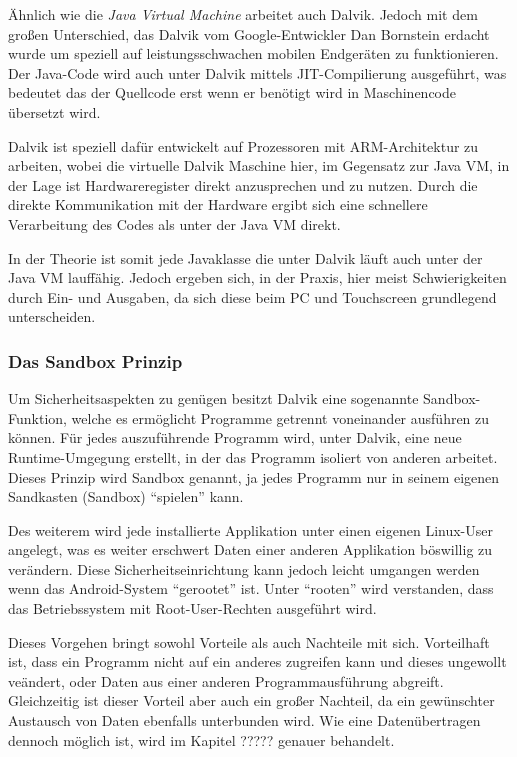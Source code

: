 \"Ahnlich wie die \emph{Java Virtual Machine} arbeitet auch Dalvik. Jedoch mit dem gro\ss{}en Unterschied, das Dalvik vom Google-Entwickler Dan Bornstein erdacht wurde um speziell auf leistungsschwachen mobilen Endger\"aten zu funktionieren. Der Java-Code wird auch unter Dalvik mittels \ac{JIT}-Compilierung ausgef\"uhrt, was bedeutet das der Quellcode erst wenn er ben\"otigt wird in Maschinencode \"ubersetzt wird.

Dalvik ist speziell daf\"ur entwickelt auf Prozessoren mit ARM-Architektur zu arbeiten, wobei die virtuelle Dalvik Maschine hier, im Gegensatz zur Java VM, in der Lage ist Hardwareregister direkt anzusprechen und zu nutzen. Durch die direkte Kommunikation mit der Hardware ergibt sich eine schnellere Verarbeitung des Codes als unter der Java VM direkt.

In der Theorie ist somit jede Javaklasse die unter Dalvik l\"auft auch unter der Java VM lauff\"ahig. Jedoch ergeben sich, in der Praxis, hier meist Schwierigkeiten durch Ein- und Ausgaben, da sich diese beim PC und Touchscreen grundlegend unterscheiden.

\subsubsection{Das Sandbox Prinzip}
Um Sicherheitsaspekten zu gen\"ugen besitzt Dalvik eine sogenannte Sandbox-Funktion, welche es erm\"oglicht Programme getrennt voneinander ausf\"uhren zu k\"onnen. F\"ur jedes auszuf\"uhrende Programm wird, unter Dalvik, eine neue Runtime-Umgegung erstellt, in der das Programm isoliert von anderen arbeitet. 
Dieses Prinzip wird Sandbox genannt, ja jedes Programm nur in seinem eigenen Sandkasten (Sandbox) "`spielen"' kann.

Des weiterem wird jede installierte Applikation unter einen eigenen Linux-User angelegt, was es weiter erschwert Daten einer anderen Applikation b\"oswillig zu ver\"andern. Diese Sicherheitseinrichtung kann jedoch leicht umgangen werden wenn das Android-System "`gerootet"' ist. Unter "`rooten"' wird verstanden, dass das Betriebssystem mit Root-User-Rechten ausgef\"uhrt wird. \cite{Android44}

Dieses Vorgehen bringt sowohl Vorteile als auch Nachteile mit sich. Vorteilhaft ist, dass ein Programm nicht auf ein anderes zugreifen kann und dieses ungewollt ve\"andert, oder Daten aus einer anderen Programmausf\"uhrung abgreift. Gleichzeitig ist dieser Vorteil aber auch ein gro\ss{}er Nachteil, da ein gew\"unschter Austausch von Daten ebenfalls unterbunden wird.
Wie eine Daten\"ubertragen dennoch m\"oglich ist, wird im Kapitel ????? genauer behandelt.

